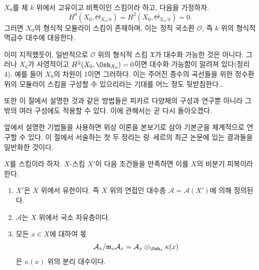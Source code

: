  $X_0$를 체 $k$ 위에서 고유이고 비특이인 스킴이라 하고,
다음을 가정하자.
\[
  H^0(X_0,\Theta_{X_0/k})=H^2(X_0,\Theta_{X_0/k})=0.
\]
그러면 $X_0$의 형식적 모듈라이 스킴이 존재하며, 이는 정칙 국소환
$\mathcal O$, 즉 $k$ 위의 형식적 멱급수 대수에 대응한다.

이미 지적했듯이, 일반적으로 $\mathcal O$ 위의 형식적 스킴 $\mathfrak X$가
대수화 가능한 것은 아니다. 그러나 $X_0$가 사영적이고
$H^2(X_0,\Osh_{X_0})=0$이면 대수화 가능함이 알려져 있다(정리 4). 예를
들어 $X_0$의 차원이 1이면 그러하다. 이는 주어진 종수의 곡선들을 위한
정수환 위의 모듈라이 스킴을 구성할 수 있으리라는 기대를 어느 정도
뒷받침한다\ldots{}

또한 이 절에서 설명한 것과 같은 방법들은 피카르 다양체의 구성과 연구뿐
아니라 그 밖의 여러 구성에도 적용할 수 있다. 이에 관해서는 곧 다시
돌아오겠다.

앞에서 설명한 기법들을 사용하면 위상 이론을 본보기로 삼아 기본군을
체계적으로 연구할 수 있다. 이 절에서 서술하는 첫 두 정리는 랑--세르의
최근 논문에 있는 결과들을 일반화한 것이다.

$X$를 스킴이라 하자. $X$-스킴 $X'$이 다음 조건들을 만족하면 이를
$X$의 비분기 피복이라 한다.
\begin{enumerate}
  \item[\textit{i.}] $X'$은 $X$ 위에서 유한이다. 즉 $X$ 위의 연접인
    대수층 $\mathcal A=\mathcal A(X')$에 의해 정의된다.
  \item[\textit{ii.}] $\mathcal A$는 $X$ 위에서 국소 자유층이다.
  \item[\textit{iii.}] 모든 $x\in X$에 대하여 몫
    \[
      \mathcal A_x/\mathfrak m_x\mathcal A_x
      =\mathcal A_x\otimes_{\Osh_x}\kappa(x)
    \]
    은 $\kappa(x)$ 위의 분리 대수이다.
\end{enumerate}

